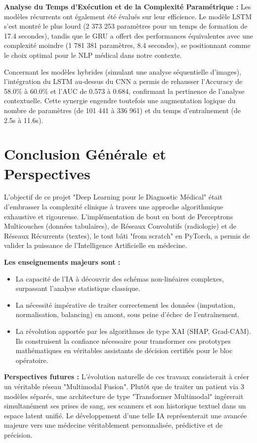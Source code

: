 \documentclass[a4paper,12pt]{report}
\begin{document}
\textbf{Analyse du Temps d'Exécution et de la Complexité Paramétrique :}
Les modèles récurrents ont également été évalués sur leur efficience. Le modèle LSTM s'est montré le plus lourd (2 373 253 paramètres pour un temps de formation de 17.4 secondes), tandis que le GRU a offert des performances équivalentes avec une complexité moindre (1 781 381 paramètres, 8.4 secondes), se positionnant comme le choix optimal pour le NLP médical dans notre contexte.

Concernant les modèles hybrides (simulant une analyse séquentielle d'images), l'intégration du LSTM au-dessus du CNN a permis de rehausser l'Accuracy de 58.0\% à 60.0\% et l'AUC de 0.573 à 0.684, confirmant la pertinence de l'analyse contextuelle. Cette synergie engendre toutefois une augmentation logique du nombre de paramètres (de 101 441 à 336 961) et du temps d'entraînement (de 2.5s à 11.6s).

\chapter*{Conclusion Générale et Perspectives}

L'objectif de ce projet "Deep Learning pour le Diagnostic Médical" était d'embrasser la complexité clinique à travers une approche algorithmique exhaustive et rigoureuse. L'implémentation de bout en bout de Perceptrons Multicouches (données tabulaires), de Réseaux Convolutifs (radiologie) et de Réseaux Récurrents (textes), le tout bâti "from scratch" en PyTorch, a permis de valider la puissance de l'Intelligence Artificielle en médecine.

\textbf{Les enseignements majeurs sont :}
\begin{itemize}
    \item La capacité de l'IA à découvrir des schémas non-linéaires complexes, surpassant l'analyse statistique classique.
    \item La nécessité impérative de traiter correctement les données (imputation, normalisation, balancing) en amont, sous peine d'échec de l'entraînement.
    \item La révolution apportée par les algorithmes de type XAI (SHAP, Grad-CAM). Ils construisent la confiance nécessaire pour transformer ces prototypes mathématiques en véritables assistants de décision certifiés pour le bloc opératoire.
\end{itemize}

\textbf{Perspectives futures :} 
L'évolution naturelle de ces travaux consisterait à créer un véritable réseau "Multimodal Fusion". Plutôt que de traiter un patient via 3 modèles séparés, une architecture de type "Transformer Multimodal" ingérerait simultanément ses prises de sang, ses scanners et son historique textuel dans un espace latent unifié. Le développement d'une telle IA représenterait une avancée majeure vers une médecine véritablement personnalisée, prédictive et de précision.
\end{document}
